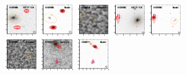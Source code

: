 \documentclass[iop]{emulateapj}
\begin{document}
\begin{figure}[!tbp]
\begin{centering}
\includegraphics[width=0.162\textwidth]{HXMM09_optical_bestfit.pdf}
\includegraphics[width=0.162\textwidth]{HXMM09_model_bestfit.pdf}
\includegraphics[width=0.162\textwidth]{HXMM09_residual_bestfit.pdf}
\includegraphics[width=0.162\textwidth]{HXMM03_optical_bestfit.pdf}
\includegraphics[width=0.162\textwidth]{HXMM03_model_bestfit.pdf}
\includegraphics[width=0.162\textwidth]{HXMM03_residual_bestfit.pdf}
\includegraphics[width=0.162\textwidth]{HXMM11_optical_bestfit.pdf}
\includegraphics[width=0.162\textwidth]{HXMM11_model_bestfit.pdf}

\end{centering}
\end{figure}
\end{document}
